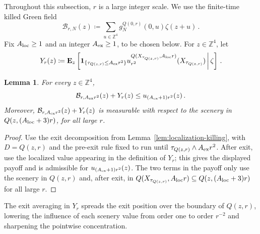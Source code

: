 \documentclass[11pt]{amsart}
\theoremstyle{plain}
\newtheorem{lemma}[theorem]{Lemma}
\theoremstyle{definition}
\newcommand{\Z}{\mathbb{Z}}
\newcommand{\one}{\mathbf{1}}
\begin{document}
Throughout this subsection, $r$ is a large integer scale.
We use the finite-time killed Green field
\[
    \mathcal B_{r,N}(z)\coloneqq
    \sum_{u\in\Z^4} g_N^{Q(0,r)}(0,u)\zeta(z+u)\, .
\]
Fix $A_{\rm loc}\geq1$ and an integer $A_{\rm ex}\geq1$, to be chosen below.
For $z\in\Z^4$, let
\[
    Y_r(z)\coloneqq
    \mathbf E_z\left[
        \one_{\{\tau_{Q(z,r)}\leq A_{\rm ex}r^2\}}
        u_{r^2}^{Q(X_{\tau_{Q(z,r)}},A_{\rm loc}r)}
        (X_{\tau_{Q(z,r)}}) \,
        \middle| \, \zeta
    \right]\, .
\]

\begin{lemma}\label{lem:d4-finite-range-lower-bound}
For every $z\in\Z^4$,
\[
    \mathcal B_{r,A_{\rm ex}r^2}(z)+Y_r(z)
    \leq u_{(A_{\rm ex}+1)r^2}(z)\, .
\]
Moreover, $\mathcal B_{r,A_{\rm ex}r^2}(z)+Y_r(z)$ is measurable with respect
to the scenery in $Q(z,(A_{\rm loc}+3)r)$, for all large $r$.
\end{lemma}
\begin{proof}
Use the exit decomposition from Lemma~\ref{lem:localization-killing}, with
$D=Q(z,r)$ and the pre-exit rule fixed to run until
$\tau_{Q(z,r)}\wedge A_{\rm ex}r^2$. After exit, use the localized value
appearing in the definition of $Y_r$; this gives the displayed payoff and is
admissible for $u_{(A_{\rm ex}+1)r^2}(z)$.
The two terms in the payoff only use the scenery in $Q(z,r)$ and, after exit,
in $Q(X_{\tau_{Q(z,r)}},A_{\rm loc}r)\subseteq Q(z,(A_{\rm loc}+3)r)$ for all
large $r$.
\end{proof}

The exit averaging in $Y_r$ spreads the exit position over the boundary of
$Q(z,r)$, lowering the influence of each scenery value from order one to order $r^{-2}$
and sharpening the pointwise concentration.
\end{document}
